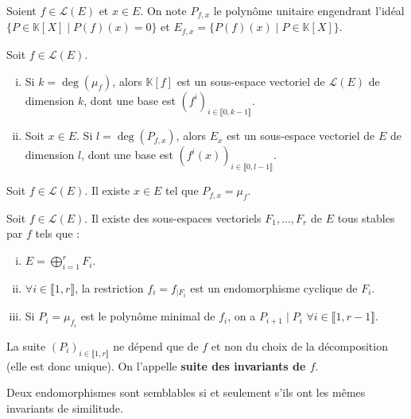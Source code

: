 
	\begin{notation}
		Soient $f \in \mathcal{L}(E)$ et $x \in E$. On note $P_{f,x}$ le polynôme unitaire engendrant l'idéal $\{ P \in \mathbb{K}[X] \mid P(f)(x) = 0 \}$ et $E_{f,x} = \{ P(f)(x) \mid P \in \mathbb{K}[X] \}$.
	\end{notation}

	\begin{lemma}
		Soit $f \in \mathcal{L}(E)$.
		\begin{enumerate}[(i)]
			\item Si $k = \deg(\mu_f)$, alors $\mathbb{K}[f]$ est un sous-espace vectoriel de $\mathcal{L}(E)$ de dimension $k$, dont une base est $(f^i)_{i \in \llbracket 0, k-1 \rrbracket}$.
			\item Soit $x \in E$. Si $l = \deg(P_{f,x})$, alors $E_x$ est un sous-espace vectoriel de $E$ de dimension $l$, dont une base est $(f^i(x))_{i \in \llbracket 0, l-1 \rrbracket}$.
		\end{enumerate}
	\end{lemma}

	\begin{lemma}
		Soit $f \in \mathcal{L}(E)$. Il existe $x \in E$ tel que $P_{f,x} = \mu_f$.
	\end{lemma}


	\begin{theorem}[Frobenius]
		Soit $f \in \mathcal{L}(E)$. Il existe des sous-espaces vectoriels $F_1, \dots, F_r$ de $E$ tous stables par $f$ tels que :
		\begin{enumerate}[(i)]
			\item $E = \bigoplus_{i = 1}^r F_i$.
			\item $\forall i \in \llbracket 1, r \rrbracket$, la restriction $f_i = f_{|F_i}$ est un endomorphisme cyclique de $F_i$.
			\item Si $P_i = \mu_{f_i}$ est le polynôme minimal de $f_i$, on a $P_{i+1} \mid P_i$ $\forall i \in \llbracket 1, r-1 \rrbracket$.
		\end{enumerate}
		La suite $(P_i)_{i \in \llbracket 1, r \rrbracket}$ ne dépend que de $f$ et non du choix de la décomposition (elle est donc unique). On l'appelle \textbf{suite des invariants de $f$}.
	\end{theorem}

	\begin{corollary}
		Deux endomorphismes sont semblables si et seulement s'ils ont les mêmes invariants de similitude.
	\end{corollary}

